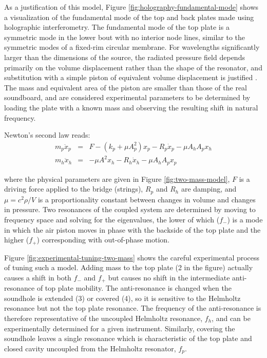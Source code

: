 \documentclass[
reprint,amsmath,amssymb,showpacs,citeautoscript,prb,twocolumn,notitlepage,floatfix
]{revtex4-1}
\begin{document}
As a justification of this model, Figure \ref{fig:holography-fundamental-mode} shows a visualization of the fundamental mode of the top and back plates made using holographic interferometry. The fundamental mode of the top plate is a symmetric mode in the lower bout with no interior node lines, similar to the symmetric modes of a fixed-rim circular membrane. For wavelengths significantly larger than the dimensions of the source, the radiated pressure field depends primarily on the volume displacement rather than the shape of the resonator, and substitution with a simple piston of equivalent volume displacement is justified \cite{kinsler2000fundamentals}. The mass and equivalent area of the piston are smaller than those of the real soundboard, and are considered experimental parameters to be determined by loading the plate with a known mass and observing the resulting shift in natural frequency.

Newton's second law reads:
\begin{align*}
m_p \ddot{x}_p & = & F - (k_p + \mu A_p ^2) x_p - R_p \dot{x}_p - \mu A_h A_p x_h \\
m_h \ddot{x}_h & = & - \mu A^2 x_h - R_h \dot{x}_h - \mu A_h A_p x_p
\end{align*}

where the physical parameters are given in Figure \ref{fig:two-mass-model}, $F$ is a driving force applied to the bridge (strings), $R_p$ and $R_h$ are damping, and $\mu = c^2 \rho / V$ is a proportionality constant between changes in volume and changes in pressure. Two resonances of the coupled system are determined by moving to frequency space and solving for the eigenvalues, the lower of which ($f_-$) is a mode in which the air piston moves in phase with the backside of the top plate and the higher ($f_+$) corresponding with out-of-phase motion.

Figure \ref{fig:experimental-tuning-two-mass} shows the careful experimental process of tuning such a model. Adding mass to the top plate (2 in the figure) actually causes a shift in both $f_-$ and $f_+$ but causes no shift in the intermediate anti-resonance of top plate mobility. The anti-resonance is changed when the soundhole is extended (3) or covered (4), so it is sensitive to the Helmholtz resonance but not the top plate resonance. The frequency of the anti-resonance is therefore representative of the uncoupled Helmholtz resonance, $f_h$, and can be experimentally determined for a given instrument. Similarly, covering the soundhole leaves a single resonance which is characteristic of the top plate and closed cavity uncoupled from the Helmholtz resonator, $f_p$.
\end{document}
